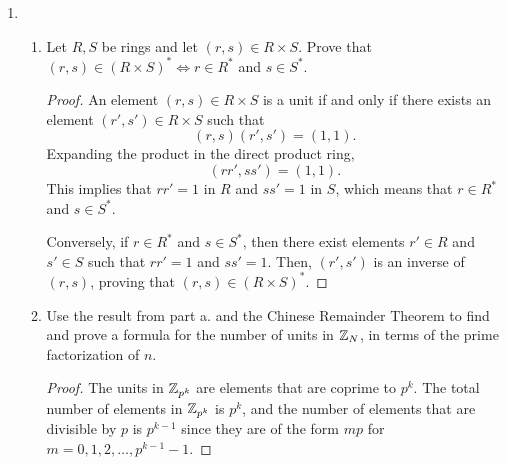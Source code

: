 \documentclass[12pt]{article}
\begin{document}
\begin{enumerate}
\begin{enumerate}
\begin{proof}
				It is clear that $\frac{\Z[X]}{(2)} \cong \Z_2[X]$ and $\frac{(2,x^2+5)}{(2)} \cong (x^2 + 5)$. So we easily get that
				\[\frac{\Z[x]}{(2,x^2+5)} \cong \frac{\Z_2[x]}{(x^2+5)}\]
				
			\end{proof}
			
			\item $(2,x^2+5)$ is not a prime ideal of $\Z[x]$.
			\begin{proof}
				To show that $(2, x^2+5)$ is not prime, we must find $f(x), g(x) \in \Z[x]$ such that 
				\[
				f(x) g(x) \in (2, x^2+5)
				\]
				but neither $f(x)$ nor $g(x)$ belongs to $(2, x^2+5)$.
				
				Consider $f(x) = x+1$ and $g(x) = x-1$. Then,
				\[
				f(x) g(x) = (x+1)(x-1) = x^2 - 1.
				\]
				We rewrite this as
				\[
				x^2 - 1 = x^2+5 - 3\cdot2 \in (2, x^2+5),
				\]
				
				However $f(x) = x+1 \not\in (2, x^2+5)$ and $g(x) = x-1 \not\in (2, x^2+5)$. This is easy to see since their linear combination $a\cdot2 + b\cdot(x^2+5)$ both require $b$ to be $0$, which immediately fails since they are not strictly a multiple of $2$.
			\end{proof}
		\end{enumerate}
	
		
		\item
		\begin{enumerate}
			\item Let $R,S$ be rings and let $(r,s) \in R \times S$. Prove that $(r,s) \in (R \times S)^* \iff r \in R^*$ and $s \in S^*$.
			\begin{proof}
				An element $(r,s) \in R \times S$ is a unit if and only if there exists an element $(r',s') \in R \times S$ such that
				\[
				(r,s) (r',s') = (1,1).
				\]
				Expanding the product in the direct product ring,
				\[
				(r r', s s') = (1,1).
				\]
				This implies that $r r' = 1$ in $R$ and $s s' = 1$ in $S$, which means that $r \in R^*$ and $s \in S^*$.
				
				Conversely, if $r \in R^*$ and $s \in S^*$, then there exist elements $r' \in R$ and $s' \in S$ such that $r r' = 1$ and $s s' = 1$. Then, $(r',s')$ is an inverse of $(r,s)$, proving that $(r,s) \in (R \times S)^*$. 
			\end{proof}
			
			\item Use the result from part a. and the Chinese Remainder Theorem to find and prove a formula for the number of units in $\mathbb{Z}_N$, in terms of the prime factorization of $n$.
			\begin{proof}
				The units in $\mathbb{Z}_{p^k}$ are elements that are coprime to $p^k$. The total number of elements in $\mathbb{Z}_{p^k}$ is $p^k$, and the number of elements that are divisible by $p$ is $p^{k-1}$ since they are of the form $mp$ for $m = 0,1,2,\dots, p^{k-1}-1$.
				

\end{proof}
\end{enumerate}
\end{enumerate}
\end{document}
